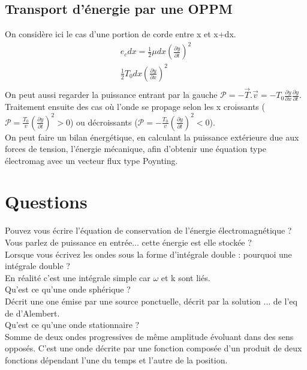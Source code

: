 \documentclass[12pt,prb,aps,epsf]{article}
\begin{document}
\subsection{Transport d'énergie par une OPPM}
On considère ici le cas d'une portion de corde entre x et x+dx.
\begin{eqnarray}
e_c dx = \frac{1}{2}\mu dx \left(\frac{\partial y}{\partial t}\right)^2\\
\frac{1}{2} T_0 dx \left(\frac{\partial y}{\partial x}\right)^2\\
\end{eqnarray}
On peut aussi regarder la puissance entrant par la gauche $\mathcal{P} = -\vec{T}.\vec{v}= -T_0 \frac{\partial y}{\partial x}\frac{\partial y}{\partial t}$. Traitement ensuite des cas où l'onde se propage selon les x croissants ($\mathcal{P} = \frac{T_0}{v}\left(\frac{\partial y}{\partial t}\right)^2 >0$) ou décroissants ($\mathcal{P} = -\frac{T_0}{v}\left(\frac{\partial y}{\partial t}\right)^2< 0$).\\
On peut faire un bilan énergétique, en calculant la puissance extérieure due aux forces de tension, l'énergie mécanique, afin d'obtenir une équation type électromag avec un vecteur flux type Poynting.\\

\section*{Questions}
Pouvez vous écrire l'équation de conservation de l'énergie électromagnétique ?\\

Vous parlez de puissance en entrée... cette énergie est elle stockée ?\\

Lorsque vous écrivez les ondes sous la forme d'intégrale double : pourquoi une intégrale double ?\\
En réalité c'est une intégrale simple car $\omega$ et k sont liés.\\

Qu'est ce qu'une onde sphérique ?\\
Décrit une one émise par une source ponctuelle, décrit par la solution ... de l'eq de d'Alembert.\\

Qu'est ce qu'une onde stationnaire ?\\
Somme de deux ondes progressives de même amplitude évoluant dans des sens opposés. C'est une onde décrite par une fonction composée d'un produit de deux fonctions dépendant l'une du temps et l'autre de la position.\\
\end{document}
